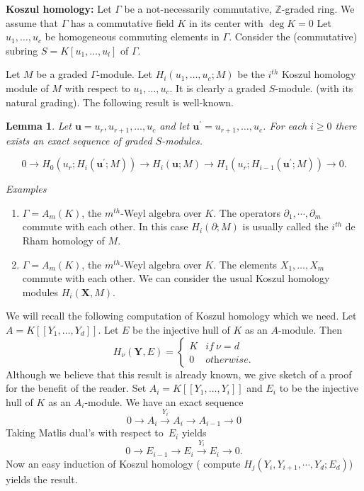 \documentclass{amsart}
\newcommand{\wrt}{with respect to}
\newcommand{\ZZ}{\mathbb{Z} }
\newcommand{\bX}{\mathbf{X} }
\newcommand{\bY}{\mathbf{Y} }
\newcommand{\rt}{\rightarrow}
\newcommand{\bP}{\mathbb{\partial}}
\theoremstyle{plain}
\newtheorem{lemma}[theorem]{Lemma}
\theoremstyle{definition}
\theoremstyle{remark}
\begin{document}
\s \textbf{ Koszul homology:} 
Let $\Gamma$ be a not-necessarily commutative, $\ZZ$-graded ring. We assume that $\Gamma$  has
a commutative field $K$ in its center with $\deg K = 0$
 Let $u_1,\ldots, u_c$ be homogeneous commuting 
elements in $\Gamma$. Consider the (commutative) subring 
 $S = K[u_1,\ldots, u_l]$ of $\Gamma$.  
 
Let $M$ be a graded $\Gamma$-module. 
Let  $H_i(u_1,\ldots, u_c; M)$ be the $i^{th}$ Koszul homology module of $M$ 
with respect to $u_1,\ldots, u_c $. It is clearly a graded $S$-module. 
(with its natural grading). The following result is well-known.
\begin{lemma}\label{exact}
Let $ \mathbf{u} = u_r,  u_{r+1}, \ldots, u_c$ and let $\mathbf{u^\prime}  = u_{r+1}, \ldots, u_c$. 
 For each $i\geq 0$ there exists an exact sequence of graded $S$-modules.

$$ 0 \rightarrow H_0(u_r; H_i(\mathbf{u^\prime}; M))\rightarrow H_i( \mathbf{u}; M) 
\rightarrow H_1(u_r; H_{i-1}(\mathbf{u^\prime} ; M)) \rightarrow 0.$$
\end{lemma}

\s \textit{Examples}
\begin{enumerate}
 \item $\Gamma = A_m(K)$, the $m^{th}$-Weyl algebra over $K$. The operators $\partial_1,\cdots, \partial_m$ commute with each other.
 In this case $H_i(\bP; M)$ is usually called the $i^{th}$ de Rham homology  of $M$.
 \item $\Gamma = A_m(K)$, the $m^{th}$-Weyl algebra over $K$. The elements $X_1,\ldots, X_m$ commute with each other.
 We can consider the usual Koszul homology modules $H_i(\bX, M)$.
\end{enumerate}

\s \label{inj-koszul} We will recall the following computation of Koszul homology
 which we need. Let $A = K[[Y_1,\ldots, Y_d]]$. Let $E$ be the injective hull of $K$ as an $A$-module.
 Then 
 \[
  H_\nu(\bY, E) = \begin{cases} 
                   K & \textit{if} \ \nu = d \\
                   0 & \textit{otherwise}.
                  \end{cases}
                  \]
Although we believe that this result is already known, we give sketch of a  proof for the benefit of the reader.
Set $A_i = K[[Y_1,\ldots, Y_i]]$ and $E_i$ to be the injective hull of $K$ as an $A_i$-module.
We have an exact sequence 
\[
 0 \rt A_i \xrightarrow{Y_i} A_i \rt A_{i-1} \rt 0
\]
Taking Matlis dual's \wrt \ $E_i$ yields
\[
 0 \rt E_{i-1} \rt E_i \xrightarrow{Y_i} E_i \rt 0.
\]
Now an easy induction of Koszul homology ( compute $H_j(Y_i, Y_{i+1},\cdots, Y_d; E_d)$) yields the result.
\end{document}
